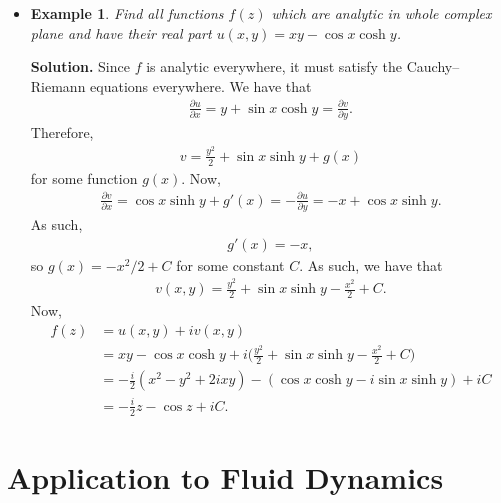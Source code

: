 \documentclass[10pt]{article}
\newtheorem{example}[lemma]{Example}
\begin{document}
\begin{itemize}
    \item \begin{example}
      Find all functions $f(z)$ which are analytic in whole complex plane and have their real part $u(x,y) = xy - \cos x \cosh y$.
    \end{example}

    {\bf Solution.} Since $f$ is analytic everywhere, it must satisfy the Cauchy--Riemann equations everywhere. We have that
    \begin{align*}
      \frac{\partial u}{\partial x} = y + \sin x \cosh y = \frac{\partial v}{\partial y}.
    \end{align*}
    Therefore,
    \begin{align*}
      v = \frac{y^2}{2} + \sin x \sinh y + g(x)
    \end{align*}
    for some function $g(x)$. Now,
    \begin{align*}
      \frac{\partial v}{\partial x} = \cos x \sinh y + g'(x) = -\frac{\partial u}{\partial y} = -x + \cos x \sinh y.    
    \end{align*}
    As such,
    \begin{align*}
      g'(x) = -x,
    \end{align*}
    so $g(x) = -x^2/2 + C$ for some constant $C$.
    As such, we have that
    \begin{align*}
      v(x,y) = \frac{y^2}{2} + \sin x \sinh y - \frac{x^2}{2} + C.
    \end{align*}
    Now,
    \begin{align*}
      f(z) 
      &= u(x,y) + iv(x,y)\\
      &= xy - \cos x \cosh y + i\bigg( \frac{y^2}{2} + \sin x \sinh y - \frac{x^2}{2} + C \bigg)\\
      &= -\frac{i}{2}( x^2 - y^2 + 2ixy ) - (\cos x \cosh y - i \sin x \sinh y) + iC\\
      &= -\frac{i}{2}z - \cos z + iC.
    \end{align*}
  \end{itemize}


  \section{Application to Fluid Dynamics} %
  \label{sec:application_to_fluid_dynamics}
\end{document}
